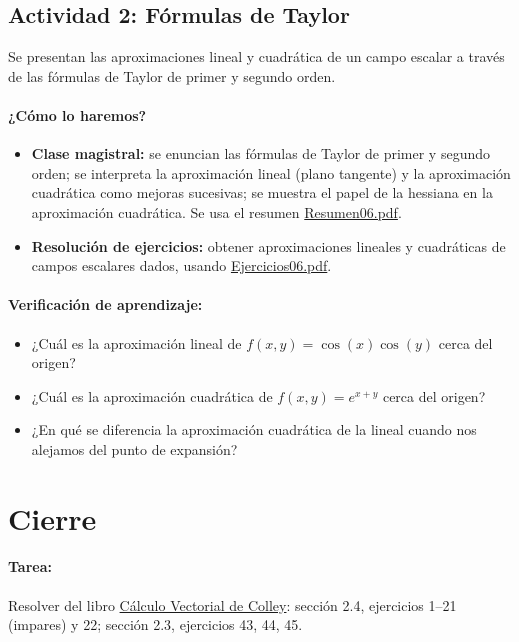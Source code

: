 \documentclass[a4,11pt]{aleph-notas}
\begin{document}
\subsection*{Actividad 2: Fórmulas de Taylor}
Se presentan las aproximaciones lineal y cuadrática de un campo escalar a través de las fórmulas de Taylor de primer y segundo orden.

\paragraph{¿Cómo lo haremos?}
\begin{itemize}[leftmargin=*]
    \item \textbf{Clase magistral:} se enuncian las fórmulas de Taylor de primer y segundo orden; se interpreta la aproximación lineal (plano tangente) y la aproximación cuadrática como mejoras sucesivas; se muestra el papel de la hessiana en la aproximación cuadrática. Se usa el resumen \href{https://andres-merino.github.io/MatematicaIII-05-N0051/01Resumen/Resumen06.pdf}{Resumen06.pdf}.
    \item \textbf{Resolución de ejercicios:} obtener aproximaciones lineales y cuadráticas de campos escalares dados, usando \href{https://andres-merino.github.io/MatematicaIII-05-N0051/04Ejercicios/Ejercicios06.pdf}{Ejercicios06.pdf}.
\end{itemize}

\paragraph{Verificación de aprendizaje:}
\begin{itemize}[leftmargin=*]
    \item ¿Cuál es la aproximación lineal de $f(x,y)=\cos(x)\cos(y)$ cerca del origen?
    \item ¿Cuál es la aproximación cuadrática de $f(x,y)=e^{x+y}$ cerca del origen?
    \item ¿En qué se diferencia la aproximación cuadrática de la lineal cuando nos alejamos del punto de expansión?
\end{itemize}

\section*{Cierre}

\paragraph{Tarea:}
Resolver del libro \href{https://catalogobiblioteca.puce.edu.ec/cgi-bin/koha/opac-detail.pl?biblionumber=83405&query_desc=su%3A%22An%C3%A1lisis%20vectorial%22}{Cálculo Vectorial de Colley}: sección 2.4, ejercicios 1--21 (impares) y 22; sección 2.3, ejercicios 43, 44, 45.
\end{document}
